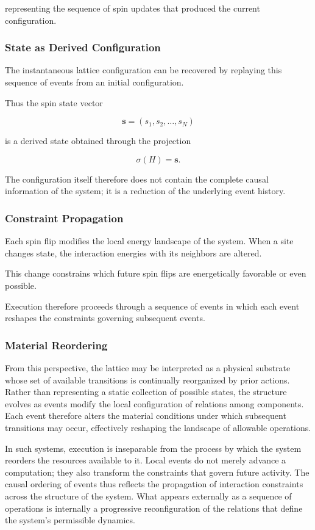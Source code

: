 \documentclass[12pt]{article}
\begin{document}
representing the sequence of spin updates that produced the
current configuration.

\subsubsection{State as Derived Configuration}

The instantaneous lattice configuration can be recovered by
replaying this sequence of events from an initial configuration.

Thus the spin state vector

\[
\mathbf{s} = (s_1, s_2, \dots, s_N)
\]

is a derived state obtained through the projection

\[
\sigma(H) = \mathbf{s}.
\]

The configuration itself therefore does not contain the
complete causal information of the system; it is a reduction
of the underlying event history.

\subsubsection{Constraint Propagation}

Each spin flip modifies the local energy landscape of the
system. When a site changes state, the interaction energies
with its neighbors are altered.

This change constrains which future spin flips are energetically
favorable or even possible.

Execution therefore proceeds through a sequence of events in
which each event reshapes the constraints governing subsequent
events.

\subsubsection{Material Reordering}

From this perspective, the lattice may be interpreted as a
physical substrate whose set of available transitions is
continually reorganized by prior actions. Rather than
representing a static collection of possible states, the
structure evolves as events modify the local configuration
of relations among components. Each event therefore alters
the material conditions under which subsequent transitions
may occur, effectively reshaping the landscape of allowable
operations.

In such systems, execution is inseparable from the process
by which the system reorders the resources available to it.
Local events do not merely advance a computation; they also
transform the constraints that govern future activity.
The causal ordering of events thus reflects the propagation
of interaction constraints across the structure of the
system. What appears externally as a sequence of operations
is internally a progressive reconfiguration of the relations
that define the system’s permissible dynamics.
\end{document}
